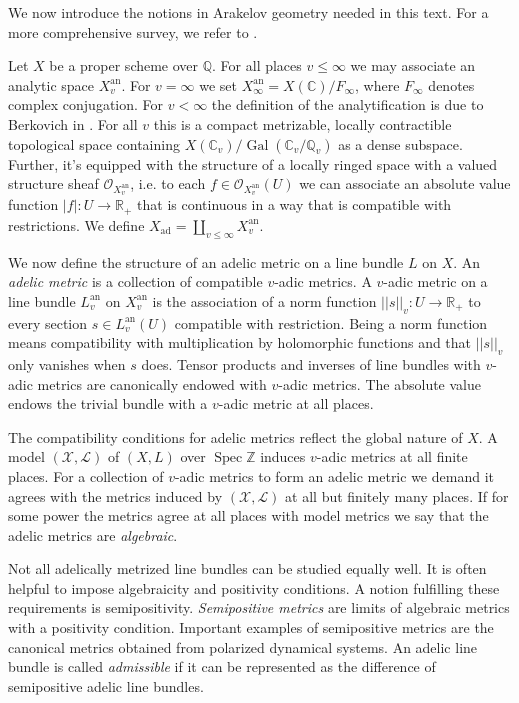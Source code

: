 \documentclass[11pt, a4paper, UKenglish]{amsart}
\newcommand{\Q}{\mathbb{Q}}
\newcommand{\sL}{\mathcal{L}}
\newcommand{\sO}{\mathcal{O}}
\newcommand{\sX}{\mathcal{X}}
\newcommand{\bbC}{\mathbb{C}}
\newcommand{\bbQ}{\mathbb{Q}}
\newcommand{\bbR}{\mathbb{R}}
\newcommand{\bbZ}{\mathbb{Z}}
\DeclareMathOperator{\Spec}{Spec}
\DeclareMathOperator{\an}{an}
\DeclareMathOperator{\ad}{ad}
\DeclareMathOperator{\Gal}{Gal}
\theoremstyle{definition}
\begin{document}
We now introduce the notions in Arakelov geometry needed in this text. For a more comprehensive survey, we refer to \cite{cl}.

Let $X$ be a proper scheme over $\Q$. For all places $v \leq \infty$ we may associate an analytic space $X^{\an}_v$. For $v = \infty$ we set $X^{\an}_\infty = X(\bbC)/F_\infty$, where $F_\infty$ denotes complex conjugation. For $v < \infty$ the definition of the analytification is due to Berkovich in \cite{berk}. For all $v$ this is a compact metrizable, locally contractible topological space containing $X(\bbC_v)/\Gal(\bbC_v/\bbQ_v)$ as a dense subspace. Further, it's equipped with the structure of a locally ringed space with a valued structure sheaf $\sO_{X^{\an}_v}$, i.e. to each $f \in \sO_{X^{\an}_v}(U)$ we can associate an absolute value function $|f|: U \to \bbR_{+}$ that is continuous in a way that is compatible with restrictions. We define $X_{\ad} = \coprod_{v\leq \infty} X^{\an}_v$.

We now define the structure of an adelic metric on a line bundle $L$ on $X$. An \emph{adelic metric} is a collection of compatible $v$-adic metrics. A $v$-adic metric on a line bundle $L^{\an}_v$ on $X^{\an}_v$ is the association of a norm function $||s||_v:U \to \bbR_+$ to every section $s \in L^{\an}_v(U)$ compatible with restriction. Being a norm function means compatibility with multiplication by holomorphic functions and that $||s||_v$ only vanishes when $s$ does. Tensor products and inverses of line bundles with $v$-adic metrics are canonically endowed with $v$-adic metrics. The absolute value endows the trivial bundle with a $v$-adic metric at all places.

The compatibility conditions for adelic metrics reflect the global nature of $X$. A model $(\sX,\sL)$ of $(X,L)$ over $\Spec \bbZ$ induces $v$-adic metrics at all finite places. For a collection of $v$-adic metrics to form an adelic metric we demand it agrees with the metrics induced by $(\sX,\sL)$ at all but finitely many places. If for some power the metrics agree at all places with model metrics we say that the adelic metrics are \emph{algebraic}.

Not all adelically metrized line bundles can be studied equally well. It is often helpful to impose algebraicity and positivity conditions. A notion fulfilling these requirements is semipositivity. \emph{Semipositive metrics} are limits of algebraic metrics with a positivity condition. Important examples of semipositive metrics are the canonical metrics obtained from polarized dynamical systems. An adelic line bundle is called \emph{admissible} if it can be represented as the difference of semipositive adelic line bundles.
\end{document}
